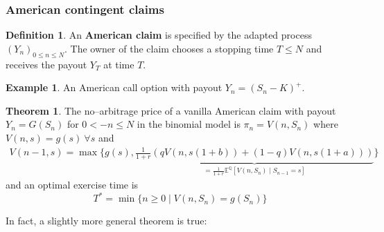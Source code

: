 \documentclass{article}
\theoremstyle{definition}
\newtheorem{theorem}{Theorem}[section]
\newtheorem{example}{Example}[section]
\newtheorem{defn}{Definition}[section]
\begin{document}
\subsubsection*{American contingent claims}
\begin{defn}
    An \textbf{American claim} is specified by the adapted process $(Y_n)_{0\le n\le N}$. The owner of the claim chooses a stopping time $T\le N$ and receives the payout $Y_T$ at time $T$.
\end{defn}
\begin{example}
    An American call option with payout $Y_n = (S_n-K)^+$.
\end{example}
\begin{theorem}
    The no--arbitrage price of a vanilla American claim with payout $Y_n=G(S_n)$ for $0<-n\le N$ in the binomial model is $\pi_n = V(n,S_n)$ where $V(n,s)=g(s) ~\forall s$ and 
    \begin{align*}
        V(n-1,s) = \max \{g(s), \underbrace{\frac{1}{1+r}\left(qV(n,s(1+b)) + (1-q)V(n,s(1+a))\right)}_{=\frac{1}{1+r}\mathbb{E}^\mathbb{Q}[V(n,S_n)\mid S_{n-1}=s]}\}
    \end{align*}
    and an optimal exercise time is \[
    T^* = \min \{n\ge 0 \mid V(n,S_n)=g(S_n)\}
    \]
\end{theorem}


In fact, a slightly more general theorem is true:
\end{document}
